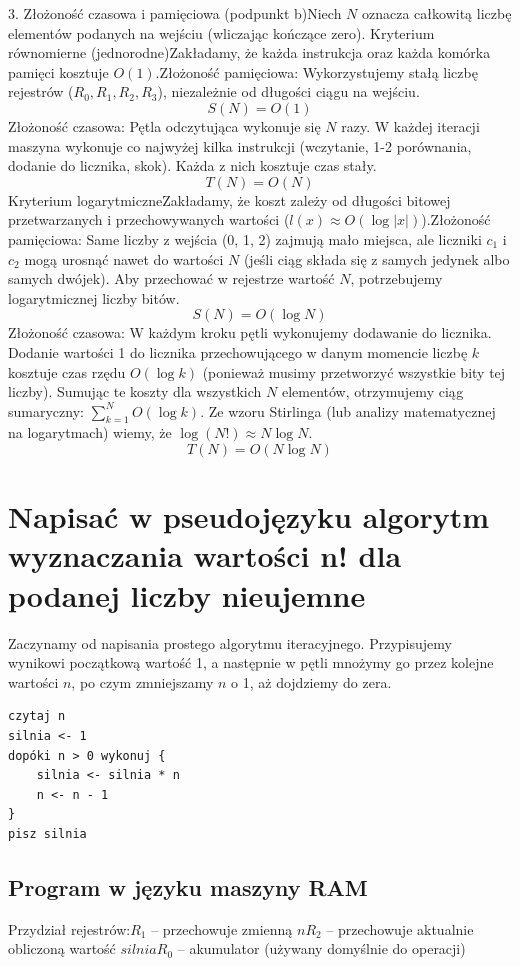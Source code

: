 \documentclass[en, color=black, device=pad, mode=geey]{elegantnote}
\begin{document}
3. Złożoność czasowa i pamięciowa (podpunkt b)Niech $N$ oznacza całkowitą liczbę elementów podanych na wejściu (wliczając kończące zero). Kryterium równomierne (jednorodne)Zakładamy, że każda instrukcja oraz każda komórka pamięci kosztuje $O(1)$.Złożoność pamięciowa: Wykorzystujemy stałą liczbę rejestrów ($R_0, R_1, R_2, R_3$), niezależnie od długości ciągu na wejściu.$$S(N) = O(1)$$Złożoność czasowa: Pętla odczytująca wykonuje się $N$ razy. W każdej iteracji maszyna wykonuje co najwyżej kilka instrukcji (wczytanie, 1-2 porównania, dodanie do licznika, skok). Każda z nich kosztuje czas stały.$$T(N) = O(N)$$Kryterium logarytmiczneZakładamy, że koszt zależy od długości bitowej przetwarzanych i przechowywanych wartości ($l(x) \approx O(\log |x|)$).Złożoność pamięciowa: Same liczby z wejścia (0, 1, 2) zajmują mało miejsca, ale liczniki $c_1$ i $c_2$ mogą urosnąć nawet do wartości $N$ (jeśli ciąg składa się z samych jedynek albo samych dwójek). Aby przechować w rejestrze wartość $N$, potrzebujemy logarytmicznej liczby bitów.$$S(N) = O(\log N)$$Złożoność czasowa: W każdym kroku pętli wykonujemy dodawanie do licznika. Dodanie wartości 1 do licznika przechowującego w danym momencie liczbę $k$ kosztuje czas rzędu $O(\log k)$ (ponieważ musimy przetworzyć wszystkie bity tej liczby). Sumując te koszty dla wszystkich $N$ elementów, otrzymujemy ciąg sumaryczny: $\sum_{k=1}^{N} O(\log k)$. Ze wzoru Stirlinga (lub analizy matematycznej na logarytmach) wiemy, że $\log(N!) \approx N \log N$.$$T(N) = O(N \log N)$$


\newpage

\section{Napisać w pseudojęzyku algorytm wyznaczania wartości n!
  dla podanej liczby nieujemne}

Zaczynamy od napisania prostego algorytmu iteracyjnego. Przypisujemy wynikowi początkową wartość 1, a następnie w pętli mnożymy go przez kolejne wartości $n$, po czym zmniejszamy $n$ o 1, aż dojdziemy do zera.

\begin{lstlisting}
czytaj n
silnia <- 1
dopóki n > 0 wykonuj {
    silnia <- silnia * n
    n <- n - 1
}
pisz silnia
\end{lstlisting}

\newpage
\subsection{Program w języku maszyny RAM}
Przydział rejestrów:$R_1$ – przechowuje zmienną $n$$R_2$ – przechowuje aktualnie obliczoną wartość $silnia$$R_0$ – akumulator (używany domyślnie do operacji)
\end{document}
